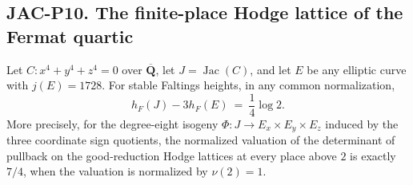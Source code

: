 
\subsection*{JAC-P10. The finite-place Hodge lattice of the Fermat quartic}

\begin{proposition}[JAC-P10]
\label{jac:P10}
Let $C:x^4+y^4+z^4=0$ over $\overline{\mathbf Q}$, let
$J=\operatorname{Jac}(C)$, and let $E$ be any elliptic curve with
$j(E)=1728$. For stable Faltings heights, in any common normalization,
\[
 h_F(J)-3h_F(E)\ =\ \frac14\log 2.                 \tag{JAC.P10.1}
\]
More precisely, for the degree-eight isogeny
$\Phi:J\to E_x\times E_y\times E_z$ induced by the three coordinate
sign quotients, the normalized valuation of the determinant of
pullback on the good-reduction Hodge lattices at every place above
$2$ is exactly $7/4$, when the valuation is normalized by $\nu(2)=1$.
\end{proposition}

